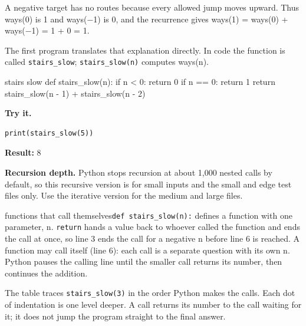 \documentclass[11pt,a4paper,oneside]{report}
\begin{document}
A negative target has no routes because every allowed jump moves upward. Thus ways(0) is 1 and ways(−1) is 0, and the recurrence gives ways(1) = ways(0) + ways(−1) = 1 + 0 = 1.

The first program translates that explanation directly. In code the function is called \texttt{stairs\_slow}; \texttt{stairs\_slow(n)} computes ways(n).

\begin{bookcode}{stairs slow}
def stairs_slow(n):
    if n < 0:
        return 0
    if n == 0:
        return 1
    return stairs_slow(n - 1) + stairs_slow(n - 2)
\end{bookcode}
\textbf{Try it.}

\begin{lstlisting}
print(stairs_slow(5))
\end{lstlisting}
\textbf{Result:} 8

\textbf{Recursion depth.} Python stops recursion at about 1,000 nested calls by default, so this recursive version is for small inputs and the small and edge test files only. Use the iterative version for the medium and large files.

\begin{pythonnote}{functions that call themselves}\texttt{def stairs\_slow(n):} defines a function with one parameter, n. \texttt{return} hands a value back to whoever called the function and ends the call at once, so line 3 ends the call for a negative n before line 6 is reached. A function may call itself (line 6): each call is a separate question with its own n. Python pauses the calling line until the smaller call returns its number, then continues the addition.\end{pythonnote}
The table traces \texttt{stairs\_slow(3)} in the order Python makes the calls. Each dot of indentation is one level deeper. A call returns its number to the call waiting for it; it does not jump the program straight to the final answer.
\end{document}
